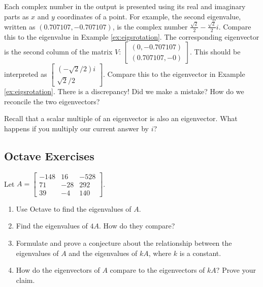 \documentclass{ximera}
\begin{document}
\begin{example}
\begin{explanation}
        Each complex number in the output is presented using its real and imaginary parts as $x$ and $y$ coordinates of a point.  For example, the second eigenvalue, written as $(0.707107,-0.707107)$, is the complex number $\frac{\sqrt{2}}{2}-\frac{\sqrt{2}}{2}i$.  Compare this to the eigenvalue in Example \ref{ex:eigsrotation}.  The corresponding eigenvector is the second column of the matrix $V$: $\begin{bmatrix}(0,-0.707107)\\(0.707107,-0)\end{bmatrix}$.  This should be interpreted as $\begin{bmatrix}(-\sqrt{2}/2)i\\\sqrt{2}/2\end{bmatrix}$.  Compare this to the eigenvector in Example \ref{ex:eigsrotation}.  There is a discrepancy!  Did we make a mistake?  How do we reconcile the two eigenvectors?
        \begin{hint}
            Recall that a scalar multiple of an eigenvector is also an eigenvector.  What happens if you multiply our current answer by $i$?
        \end{hint}
        \end{explanation}
        \end{example}

\subsection*{Octave Exercises}   
\begin{problem}\label{prob_oct_eig0}
    Let $A=\begin{bmatrix}-148 & 16 & -528\\
        71 & -28 & 292\\
        39 & -4 & 140\end{bmatrix}$.  
        \begin{enumerate}
        \item Use Octave to find the eigenvalues of $A$.  
        \item Find the eigenvalues of $4A$.  How do they compare?
        \item Formulate and prove a conjecture about the relationship between the eigenvalues of $A$ and the eigenvalues of $kA$, where $k$ is a constant.
        \item How do the eigenvectors of $A$ compare to the eigenvectors of $kA$?  Prove your claim.
        \end{enumerate}
        
\end{problem}
\end{document}
